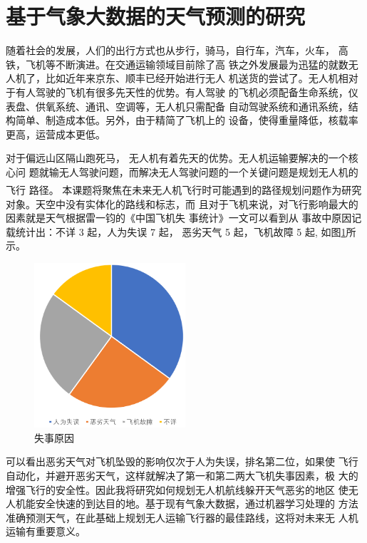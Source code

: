 \documentclass[UTF8,a4paper,10pt,nocolorlinks]{ctexart}
\newcommand{\upcite}[1]{\textsuperscript{\textsuperscript{\cite{#1}}}}
\begin{document}
\section{基于气象大数据的天气预测的研究}
随着社会的发展，人们的出行方式也从步行，骑马，自行车，汽车，火车，
高铁，飞机等不断演进。在交通运输领域目前除了高
铁之外发展最为迅猛的就数无人机了，比如近年来京东、顺丰已经开始进行无人
机送货的尝试了。无人机相对于有人驾驶的飞机有很多先天性的优势。有人驾驶
的飞机必须配备生命系统，仪表盘、供氧系统、通讯、空调等，无人机只需配备
自动驾驶系统和通讯系统，结构简单、制造成本低。另外，由于精简了飞机上的
设备，使得重量降低，核载率更高，运营成本更低。  \par 对于偏远山区隔山跑死马，
无人机有着先天的优势。无人机运输要解决的一个核心问
题就输无人驾驶问题，而解决无人驾驶问题的一个关键问题是规划无人机的飞行
路径。 
本课题\upcite{weather}将聚焦在未来无人机飞行时可能遇到的路径规划问题作为研究对象。天空中没有实体化的路线和标志，而
且对于飞机来说，对飞行影响最大的因素就是天气根据雷一钧的《中国飞机失
事统计》一文可以看到从  事故中原因记载统计出：不详 3 起，人为失误 7 起，
恶劣天气 5 起，飞机故障 5 起, 如图\ref{reason}所示。
\begin{figure}[h]
  \centering %
  \includegraphics[width=0.5\textwidth]{reason.png} %
  \caption{失事原因}
  \label{reason}
\end{figure}
\par 可以看出恶劣天气对飞机坠毁的影响仅次于人为失误，排名第二位，如果使
飞行自动化，并避开恶劣天气，这样就解决了第一和第二两大飞机失事因素，极
大的增强飞行的安全性。因此我将研究如何规划无人机航线躲开天气恶劣的地区
使无人机能安全快速的到达目的地。基于现有气象大数据，通过机器学习处理的
方法准确预测天气，在此基础上规划无人运输飞行器的最佳路线，这将对未来无
人机运输有重要意义。 
\end{document}
